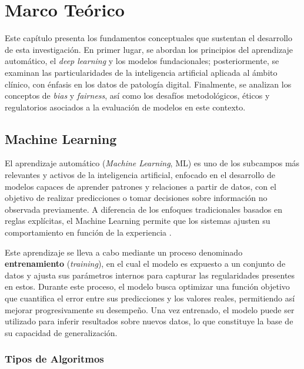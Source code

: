 \chapter{Marco Teórico}

Este capítulo presenta los fundamentos conceptuales que sustentan el desarrollo de esta investigación. En primer lugar, se abordan los principios del aprendizaje automático, el \textit{deep learning} y los modelos fundacionales; posteriormente, se examinan las particularidades de la inteligencia artificial aplicada al ámbito clínico, con énfasis en los datos de patología digital. Finalmente, se analizan los conceptos de \textit{bias} y \textit{fairness}, así como los desafíos metodológicos, éticos y regulatorios asociados a la evaluación de modelos en este contexto.

\section{Machine Learning}

El aprendizaje automático (\textit{Machine Learning}, ML) es uno de los subcampos más relevantes y activos de la inteligencia 
artificial, enfocado en el desarrollo de modelos capaces de aprender patrones y relaciones a partir de datos, con el 
objetivo de realizar predicciones o tomar decisiones sobre información no observada previamente. A diferencia de los 
enfoques tradicionales basados en reglas explícitas, el Machine Learning permite que los sistemas ajusten su 
comportamiento en función de la experiencia \parencite{sarker2021machine}.

Este aprendizaje se lleva a cabo mediante un proceso denominado \textbf{entrenamiento} (\textit{training}), en el cual el 
modelo es expuesto a un conjunto de datos y ajusta sus parámetros internos para capturar las regularidades presentes en 
estos. Durante este proceso, el modelo busca optimizar una función objetivo que cuantifica el error entre sus predicciones 
y los valores reales, permitiendo así mejorar progresivamente su desempeño. Una vez entrenado, el modelo puede ser 
utilizado para inferir resultados sobre nuevos datos, lo que constituye la base de su capacidad de generalización.


\subsection{Tipos de Algoritmos}


